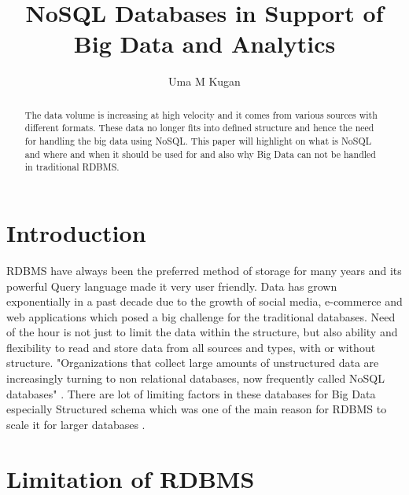 \documentclass[sigconf]{acmart}
\begin{document}
\title{NoSQL Databases in Support of Big Data and Analytics}


\author{Uma M Kugan}

\renewcommand{\shortauthors}{Uma}


\begin{abstract}
The data volume is increasing at high velocity and it comes from various sources with different formats. These data no longer fits into defined structure and hence the need for handling the big data using NoSQL. This paper will highlight on what is NoSQL and where and when it should be used for and also why Big Data can not be handled in traditional RDBMS.
\end{abstract}



\maketitle

\section{Introduction}

RDBMS have always been the preferred method of storage for many years and its powerful Query language made it very user friendly. Data has grown exponentially in a past decade due to the growth of social media, e-commerce and web applications which posed a big challenge for the traditional databases. Need of the hour is not just to limit the data within the structure, but also ability and flexibility to read and store data from all sources and types, with or without structure. "Organizations that collect large amounts of unstructured data are increasingly turning to non relational databases, now frequently called NoSQL databases" \cite{neal}. There are lot of limiting factors in these databases for Big Data especially Structured schema which was one of the main reason for RDBMS to scale it for larger databases \cite{aspire}.

\section{Limitation of RDBMS}
\end{document}
